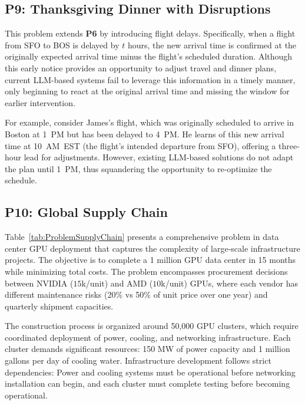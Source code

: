 \subsection*{P9: Thanksgiving Dinner with Disruptions}

This problem extends \textbf{P6} by introducing flight delays. Specifically, when a flight from SFO to BOS is delayed by $t$ hours, the new arrival time is confirmed at the originally expected arrival time minus the flight’s scheduled duration. Although this early notice provides an opportunity to adjust travel and dinner plans, current LLM-based systems fail to leverage this information in a timely manner, only beginning to react at the original arrival time and missing the window for earlier intervention.

For example, consider James’s flight, which was originally scheduled to arrive in Boston at 1~PM but has been delayed to 4~PM. He learns of this new arrival time at 10~AM~EST (the flight’s intended departure from SFO), offering a three-hour lead for adjustments. However, existing LLM-based solutions do not adapt the plan until 1~PM, thus squandering the opportunity to re-optimize the schedule.



\subsection*{P10: Global Supply Chain}



Table~\ref{tab:ProblemSupplyChain} presents a comprehensive problem in data center GPU deployment that captures the complexity of large-scale infrastructure projects. The objective is to complete a 1 million GPU data center in 15 months while minimizing total costs. The problem encompasses procurement decisions between NVIDIA ($15$k/unit) and AMD ($10$k/unit) GPUs, where each vendor has different maintenance risks (20\% vs 50\% of unit price over one year) and quarterly shipment capacities.

The construction process is organized around 50,000 GPU clusters, which require coordinated deployment of power, cooling, and networking infrastructure. Each cluster demands significant resources: 150 MW of power capacity and 1 million gallons per day of cooling water. Infrastructure development follows strict dependencies: Power and cooling systems must be operational before networking installation can begin, and each cluster must complete testing before becoming operational.

